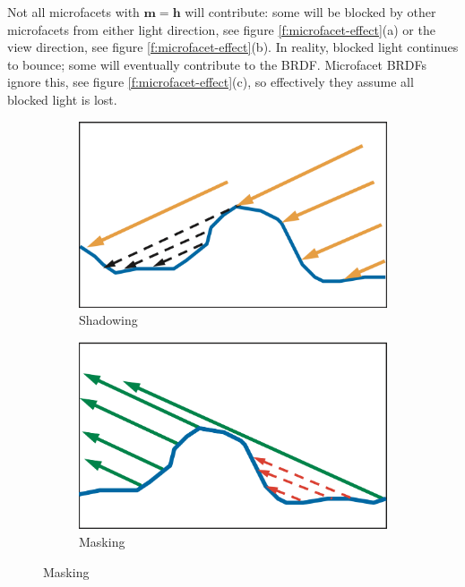 Not all microfacets with $\mathbf{m}=\mathbf{h}$ will contribute: some will be blocked by other microfacets from either light direction, see figure \ref{f:microfacet-effect}(a) or the view direction, see figure \ref{f:microfacet-effect}(b). In reality, blocked light continues to bounce; some will eventually contribute to the BRDF. Microfacet BRDFs ignore this, see figure \ref{f:microfacet-effect}(c), so effectively they assume all blocked light is lost.

\begin{figure}\label{f:microfacet-effect}
\begin{center}
	\begin{subfigure}[b]{0.34\textwidth}
		\includegraphics[width=1.\textwidth]{graphics/gi/ray-optics-10-1}
		\caption{Shadowing}
	\end{subfigure}
	\begin{subfigure}[b]{0.34\textwidth}
		\includegraphics[width=1.\textwidth]{graphics/gi/ray-optics-10-2}
		\caption{Masking}
	\end{subfigure}

\end{center}
\end{figure}
